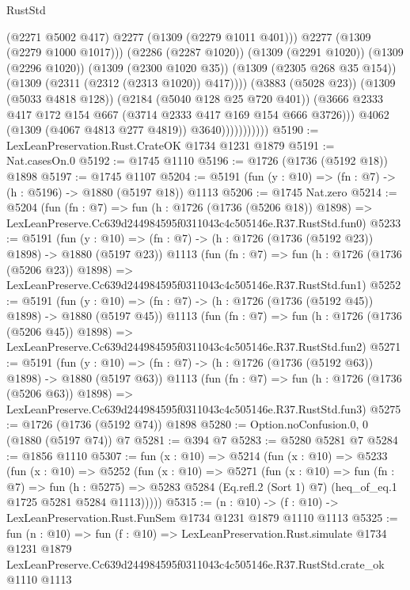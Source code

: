 \begin{lexlean}{RustStd}
\begin{coremodule}
                                    (@2271 @5002 @417)
                                    @2277
                                    (@1309 (@2279 @1011 @401)))
                                  @2277
                                  (@1309 (@2279 @1000 @1017)))
                                (@2286 (@2287 @1020))
                                (@1309 (@2291 @1020))
                                (@1309 (@2296 @1020))
                                (@1309 (@2300 @1020 @35))
                                (@1309 (@2305 @268 @35 @154))
                                (@1309 (@2311 (@2312 (@2313 @1020)) @417))))
                            (@3883 (@5028 @23))
                            (@1309 (@5033 @4818 @128))
                            (@2184 (@5040 @128 @25 @720 @401))
                            (@3666
                              @2333
                              @417
                              @172
                              @154
                              @667
                              (@3714 @2333 @417 @169 @154 @666 @3726)))
                          @4062
                          (@1309 (@4067 @4813 @277 @4819))
                          @3640)))))))))))
@5190 := LexLeanPreservation.Rust.CrateOK @1734 @1231 @1879
@5191 := Nat.casesOn.{0}
@5192 := @1745 @1110
@5196 := @1726 (@1736 (@5192 @18)) @1898
@5197 := @1745 @1107
@5204 := @5191 (fun (y : @10) => (fn : @7) -> (h : @5196) -> @1880 (@5197 @18)) @1113
@5206 := @1745 Nat.zero
@5214 := @5204
    (fun (fn : @7) =>
    fun (h : @1726 (@1736 (@5206 @18)) @1898) =>
    LexLeanPreserve.Cc639d244984595f0311043c4c505146e.R37.RustStd.fun0)
@5233 := @5191
    (fun (y : @10) => (fn : @7) -> (h : @1726 (@1736 (@5192 @23)) @1898) -> @1880 (@5197 @23))
    @1113
    (fun (fn : @7) =>
    fun (h : @1726 (@1736 (@5206 @23)) @1898) =>
    LexLeanPreserve.Cc639d244984595f0311043c4c505146e.R37.RustStd.fun1)
@5252 := @5191
    (fun (y : @10) => (fn : @7) -> (h : @1726 (@1736 (@5192 @45)) @1898) -> @1880 (@5197 @45))
    @1113
    (fun (fn : @7) =>
    fun (h : @1726 (@1736 (@5206 @45)) @1898) =>
    LexLeanPreserve.Cc639d244984595f0311043c4c505146e.R37.RustStd.fun2)
@5271 := @5191
    (fun (y : @10) => (fn : @7) -> (h : @1726 (@1736 (@5192 @63)) @1898) -> @1880 (@5197 @63))
    @1113
    (fun (fn : @7) =>
    fun (h : @1726 (@1736 (@5206 @63)) @1898) =>
    LexLeanPreserve.Cc639d244984595f0311043c4c505146e.R37.RustStd.fun3)
@5275 := @1726 (@1736 (@5192 @74)) @1898
@5280 := Option.noConfusion.{0, 0} (@1880 (@5197 @74)) @7
@5281 := @394 @7
@5283 := @5280 @5281 @7
@5284 := @1856 @1110
@5307 := fun (x : @10) =>
  @5214
    (fun (x : @10) =>
    @5233
      (fun (x : @10) =>
      @5252
        (fun (x : @10) =>
        @5271
          (fun (x : @10) =>
          fun (fn : @7) =>
          fun (h : @5275) =>
          @5283 @5284 (Eq.refl.{2} (Sort 1) @7) (heq_of_eq.{1} @1725 @5281 @5284 @1113)))))
@5315 := (n : @10) -> (f : @10) -> LexLeanPreservation.Rust.FunSem @1734 @1231 @1879 @1110 @1113
@5325 := fun (n : @10) =>
  fun (f : @10) =>
  LexLeanPreservation.Rust.simulate
    @1734
    @1231
    @1879
    LexLeanPreserve.Cc639d244984595f0311043c4c505146e.R37.RustStd.crate_ok
    @1110
    @1113
\end{coremodule}
\end{lexlean}
